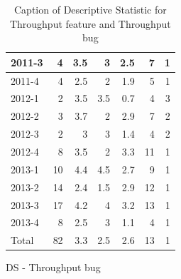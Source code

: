 \documentclass[UKenglish]{ifimaster}  %
\begin{document}
\begin{appendices}
\begin{table}[!htbp]
\begin{adjustwidth}{-2.5cm}{}
\begin{subfigure}[b]{0.3\textwidth}
{\begin{tabular}{ | l | r | r | r | r | r | r | }
 2011-3  & 4 & 3.5 & 3 & 2.5 & 7 & 1 \\ \hline
 2011-4  & 4 & 2.5 & 2 & 1.9 & 5 & 1 \\ \hline
 2012-1  & 2 & 3.5 & 3.5 & 0.7 & 4 & 3 \\ \hline
 2012-2  & 3 & 3.7 & 2 & 2.9 & 7 & 2 \\ \hline
 2012-3  & 2 & 3 & 3 & 1.4 & 4 & 2 \\ \hline
 2012-4  & 8 & 3.5 & 2 & 3.3 & 11 & 1 \\ \hline
 2013-1  & 10 & 4.4 & 4.5 & 2.7 & 9 & 1 \\ \hline
 2013-2  & 14 & 2.4 & 1.5 & 2.9 & 12 & 1 \\ \hline
 2013-3  & 17 & 4.2 & 4 & 3.2 & 13 & 1 \\ \hline
 2013-4  & 8 & 2.5 & 3 & 1.1 & 4 & 1 \\ \hline
 Total  & 82 & 3.3 & 2.5 & 2.6 & 13 & 1 \\ \hline
\end{tabular}
}
\caption{DS - Throughput bug}
 \label{DS:TPB:6}
\end{subfigure}
\end{adjustwidth}
\caption[Optional caption for list of figures]{Caption of Descriptive Statistic for Throughput feature and Throughput bug}
\label{DS:6:2}
\end{table}




\end{appendices}
\end{document}
